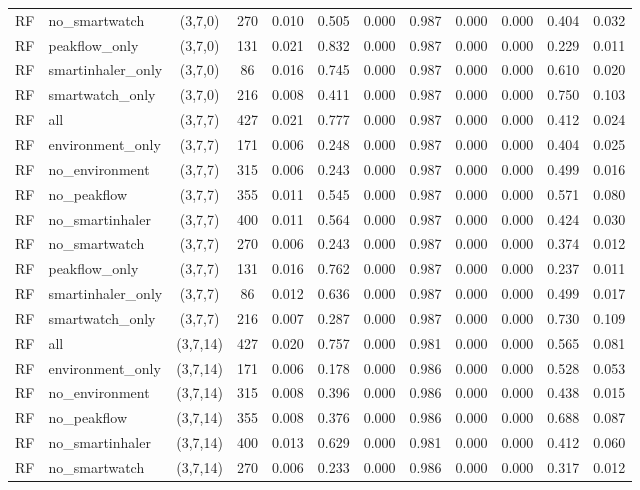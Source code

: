 \begin{longtable}{llcccccccccc}
RF & no\_smartwatch & (3,7,0) & 270 & 0.010 & 0.505 & 0.000 & 0.987 & 0.000 & 0.000 & 0.404 & 0.032 \\
RF & peakflow\_only & (3,7,0) & 131 & 0.021 & 0.832 & 0.000 & 0.987 & 0.000 & 0.000 & 0.229 & 0.011 \\
RF & smartinhaler\_only & (3,7,0) & 86 & 0.016 & 0.745 & 0.000 & 0.987 & 0.000 & 0.000 & 0.610 & 0.020 \\
RF & smartwatch\_only & (3,7,0) & 216 & 0.008 & 0.411 & 0.000 & 0.987 & 0.000 & 0.000 & 0.750 & 0.103 \\
RF & all & (3,7,7) & 427 & 0.021 & 0.777 & 0.000 & 0.987 & 0.000 & 0.000 & 0.412 & 0.024 \\
RF & environment\_only & (3,7,7) & 171 & 0.006 & 0.248 & 0.000 & 0.987 & 0.000 & 0.000 & 0.404 & 0.025 \\
RF & no\_environment & (3,7,7) & 315 & 0.006 & 0.243 & 0.000 & 0.987 & 0.000 & 0.000 & 0.499 & 0.016 \\
RF & no\_peakflow & (3,7,7) & 355 & 0.011 & 0.545 & 0.000 & 0.987 & 0.000 & 0.000 & 0.571 & 0.080 \\
RF & no\_smartinhaler & (3,7,7) & 400 & 0.011 & 0.564 & 0.000 & 0.987 & 0.000 & 0.000 & 0.424 & 0.030 \\
RF & no\_smartwatch & (3,7,7) & 270 & 0.006 & 0.243 & 0.000 & 0.987 & 0.000 & 0.000 & 0.374 & 0.012 \\
RF & peakflow\_only & (3,7,7) & 131 & 0.016 & 0.762 & 0.000 & 0.987 & 0.000 & 0.000 & 0.237 & 0.011 \\
RF & smartinhaler\_only & (3,7,7) & 86 & 0.012 & 0.636 & 0.000 & 0.987 & 0.000 & 0.000 & 0.499 & 0.017 \\
RF & smartwatch\_only & (3,7,7) & 216 & 0.007 & 0.287 & 0.000 & 0.987 & 0.000 & 0.000 & 0.730 & 0.109 \\
RF & all & (3,7,14) & 427 & 0.020 & 0.757 & 0.000 & 0.981 & 0.000 & 0.000 & 0.565 & 0.081 \\
RF & environment\_only & (3,7,14) & 171 & 0.006 & 0.178 & 0.000 & 0.986 & 0.000 & 0.000 & 0.528 & 0.053 \\
RF & no\_environment & (3,7,14) & 315 & 0.008 & 0.396 & 0.000 & 0.986 & 0.000 & 0.000 & 0.438 & 0.015 \\
RF & no\_peakflow & (3,7,14) & 355 & 0.008 & 0.376 & 0.000 & 0.986 & 0.000 & 0.000 & 0.688 & 0.087 \\
RF & no\_smartinhaler & (3,7,14) & 400 & 0.013 & 0.629 & 0.000 & 0.981 & 0.000 & 0.000 & 0.412 & 0.060 \\
RF & no\_smartwatch & (3,7,14) & 270 & 0.006 & 0.233 & 0.000 & 0.986 & 0.000 & 0.000 & 0.317 & 0.012 \\

\end{longtable}
